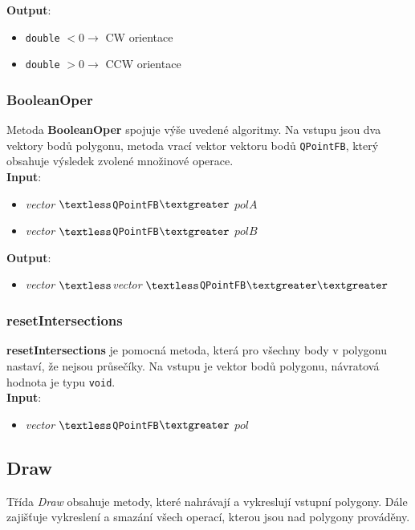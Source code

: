 \documentclass[a4paper, 12pt]{article}
\begin{document}
\textbf{Output}:
\begin{itemize}
\item \texttt{double} $< 0 \rightarrow$ CW orientace
\item \texttt{double} $> 0 \rightarrow$ CCW orientace
\end{itemize}

\subsubsection*{BooleanOper}
Metoda \textbf{BooleanOper} spojuje výše uvedené algoritmy. Na vstupu jsou dva vektory bodů polygonu, metoda vrací vektor vektoru bodů \texttt{QPointFB}, který obsahuje výsledek zvolené množinové operace.\\

\textbf{Input}:
\begin{itemize}
\item \textsl{vector} $\textless$\texttt{QPointFB}$\textgreater$ $polA$
\item \textsl{vector} $\textless$\texttt{QPointFB}$\textgreater$ $polB$
\end{itemize}

\textbf{Output}:
\begin{itemize}
\item \textsl{vector} $\textless$\textsl{vector} $\textless$\texttt{QPointFB}$\textgreater \textgreater$
\end{itemize}

\subsubsection*{resetIntersections}
\textbf{resetIntersections} je pomocná metoda, která pro všechny body v polygonu nastaví, že nejsou průsečíky. Na vstupu je vektor bodů polygonu, návratová hodnota je typu \texttt{void}.\\

\textbf{Input}:
\begin{itemize}
\item \textsl{vector} $\textless$\texttt{QPointFB}$\textgreater$ $pol$
\end{itemize}

\subsection{Draw}
Třída \textit{Draw} obsahuje metody, které nahrávají a vykreslují vstupní polygony. Dále zajišťuje vykreslení a smazání všech operací, kterou jsou nad polygony prováděny.
\end{document}
